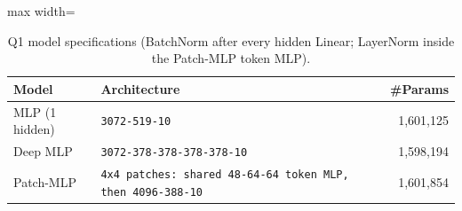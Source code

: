 \begin{table}[t]
\centering
\footnotesize
\setlength{\tabcolsep}{3.5pt}
\begin{adjustbox}{max width=\linewidth}
\begin{tabular}{llr}
\toprule
Model & Architecture & \#Params \\
\midrule
MLP (1 hidden) & \texttt{3072-519-10} & 1,601,125 \\
Deep MLP & \texttt{3072-378-378-378-378-10} & 1,598,194 \\
Patch-MLP & \texttt{4x4 patches: shared 48-64-64 token MLP, then 4096-388-10} & 1,601,854 \\
\bottomrule
\end{tabular}
\end{adjustbox}
\caption{Q1 model specifications (BatchNorm after every hidden Linear; LayerNorm inside the Patch-MLP token MLP).}
\label{tab:q1spec}
\end{table}
